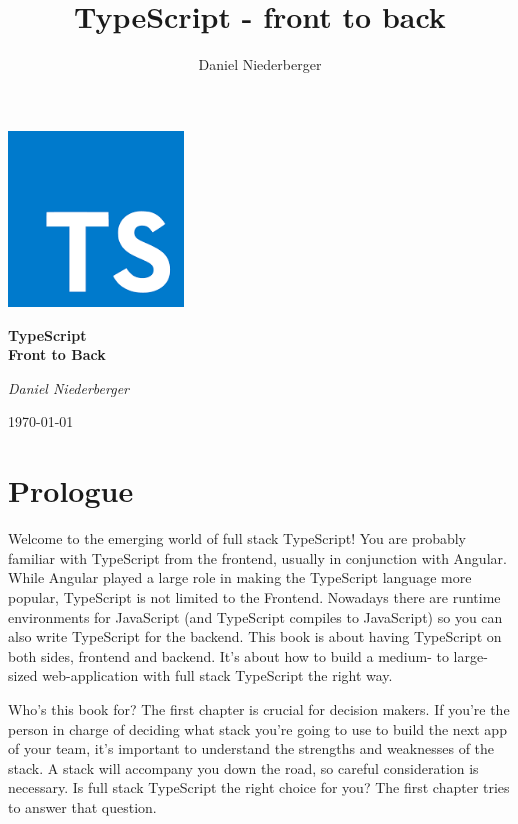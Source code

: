\documentclass[12pt,a4paper]{report}
\title{TypeScript - front to back}
\author{Daniel Niederberger}
\begin{document}
\begin{titlepage}
	\centering
	\includegraphics[width=0.35\textwidth]{figures/cover-image.png}\par
	\vspace{1cm}
	\vspace{1.5cm}
	{\huge\bfseries TypeScript \\ \Huge{Front to Back}\par}
	\vspace{2cm}
	{\Large\itshape Daniel Niederberger\par}

	\vfill

	{\large \today\par}
\end{titlepage}

\tableofcontents
\newpage

\chapter*{Prologue}
Welcome to the emerging world of full stack TypeScript! You are probably familiar with TypeScript from the frontend, usually in conjunction with Angular. While Angular played a large role in making the TypeScript language more popular, TypeScript is not limited to the Frontend. Nowadays there are runtime environments for JavaScript (and TypeScript compiles to JavaScript) so you can also write TypeScript for the backend. This book is about having TypeScript on both sides, frontend and backend. It's about how to build a medium- to large-sized web-application with full stack TypeScript the right way.

Who's this book for? The first chapter is crucial for decision makers. If you're the person in charge of deciding what stack you're going to use to build the next app of your team, it's important to understand the strengths and weaknesses of the stack. A stack will accompany you down the road, so careful consideration is necessary. Is full stack TypeScript the right choice for you? The first chapter tries to answer that question.
\end{document}
